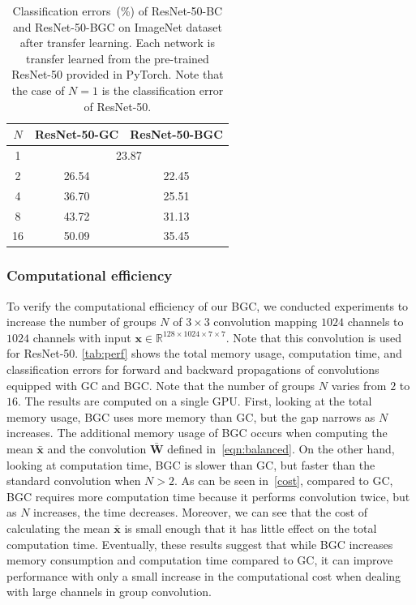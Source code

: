 \documentclass[preprint,12pt,authoryear]{elsarticle}
\numberwithin{equation}{section}
\theoremstyle{remark}
\newcommand\R{\mathbb{R}}
\newcommand\bW{\mathbf{W}}
\newcommand\bx{\mathbf{x}}
\begin{document}
\begin{table}
    \centering
    \caption{Classification errors~(\%) of ResNet-50-BC and ResNet-50-BGC on ImageNet dataset after transfer learning. Each network is transfer learned from the pre-trained ResNet-50 provided in PyTorch. Note that the case of $N=1$ is the classification error of ResNet-50.}
    \label{tab:transfer}
    \begin{tabular}{c|c|c}
    \toprule
    $N$  & ResNet-50-GC    & ResNet-50-BGC   \\ \midrule
    1  & \multicolumn{2}{c}{23.87} \\ \midrule
    2  & 26.54 & 22.45 \\
    4  & 36.70 & 25.51 \\
    8  & 43.72 & 31.13\\
    16 & 50.09 & 35.45 \\ \bottomrule
    \end{tabular}
\end{table}

\subsubsection{Computational efficiency}
To verify the computational efficiency of our BGC, we conducted experiments to increase the number of groups $N$ of $3 \times 3$ convolution mapping $1024$ channels to $1024$ channels with input $\bx \in \R^{128 \times 1024 \times 7 \times 7}$.
Note that this convolution is used for ResNet-50.
\cref{tab:perf} shows the total memory usage, computation time, and classification errors for forward and backward propagations of convolutions equipped with GC and BGC.
Note that the number of groups $N$ varies from $2$ to $16$.
The results are computed on a single GPU.
First, looking at the total memory usage, BGC uses more memory than GC, but the gap narrows as $N$ increases.
The additional memory usage of BGC occurs when computing the mean $\bar{\bx}$ and the convolution $\bar{\bW}$ defined in~\eqref{eqn:balanced}.
On the other hand, looking at computation time, BGC is slower than GC, but faster than the standard convolution when $N>2$.
As can be seen in~\eqref{cost}, compared to GC, BGC requires more computation time because it performs convolution twice, but as $N$ increases, the time decreases.
Moreover, we can see that the cost of calculating the mean $\bar{\bx}$ is small enough that it has little effect on the total computation time.
Eventually, these results suggest that while BGC increases memory consumption and computation time compared to GC, it can improve performance with only a small increase in the computational cost when dealing with large channels in group convolution.
\end{document}
